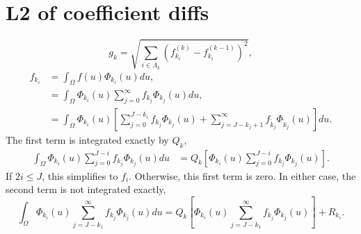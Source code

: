 \documentclass[11pt]{article}
\begin{document}
\section{L2 of coefficient diffs}
\begin{equation}
g_k = \sqrt{\sum_{i\in\Lambda_k}\left(f_{k_i}^{(k)} - f_{k_i}^{(k-1)}\right)^2},
\end{equation}
\begin{align}
f_{k_i} &= \int_\Omega f(u)\Phi_{k_i}(u)du, \\
 & = \int_\Omega \Phi_{k_i}(u)\sum_{j=0}^\infty f_{k_j}\Phi_{k_j}(u) du, \\
 & = \int_\Omega \Phi_{k_i}(u)\left[\sum_{j=0}^{J-k_i}f_{k_j}\Phi_{k_j}(u) + \sum_{j=J-k_j+1}^{\infty}f_{\tilde k_j}\Phi_{\tilde k_j}(u)\right]du.
\end{align}
The first term is integrated exactly by $Q_k$,
\begin{align}
\int_\Omega \Phi_{k_i}(u)\sum_{j=0}^{J-i} f_{k_j}\Phi_{k_j}(u)du &= Q_k\left[\Phi_{k_i}(u)\sum_{j=0}^{J-i} f_{k_j}\Phi_{k_j}(u)\right].
\end{align}
If $2i\leq J$, this simplifies to $f_i$.  Otherwise, this first term is zero.  In either case, the second term is not integrated exactly,
\begin{equation}
\int_\Omega \Phi_{k_i}(u)\sum_{j=J-k_1}^\infty f_{k_j}\Phi_{k_j}(u)du = Q_k\left[\Phi_{k_i}(u)\sum_{j=J-k_1}^\infty f_{k_j}\Phi_{k_j}(u)\right]+R_{k_i}.
\end{equation}
\end{document}
